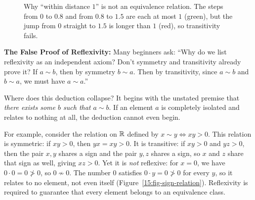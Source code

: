 \begin{figure}[htbp]
\centering
{}
\caption{Why ``within distance $1$'' is not an equivalence relation. The steps from $0$ to $0.8$ and from $0.8$ to $1.5$ are each at most $1$ (green), but the jump from $0$ straight to $1.5$ is longer than $1$ (red), so transitivity fails.}
\label{15:fig-closeness-trap}
\end{figure}

\begin{trapbox}
\textbf{The False Proof of Reflexivity:}
Many beginners ask: ``Why do we list reflexivity as an independent axiom? Don't symmetry and transitivity already prove it? If $a \sim b$, then by symmetry $b \sim a$. Then by transitivity, since $a \sim b$ and $b \sim a$, we must have $a \sim a$.''

Where does this deduction collapse? It begins with the unstated premise that \emph{there exists some $b$ such that $a \sim b$}. If an element $a$ is completely isolated and relates to nothing at all, the deduction cannot even begin.

For example, consider the relation on $\mathbb{R}$ defined by $x \sim y \iff xy > 0$. 
This relation is symmetric: if $xy > 0$, then $yx = xy > 0$.
It is transitive: if $xy > 0$ and $yz > 0$, then the pair $x, y$ shares a sign and the pair $y, z$ shares a sign, so $x$ and $z$ share that sign as well, giving $xz > 0$.
Yet it is \emph{not} reflexive: for $x = 0$, we have $0 \cdot 0 = 0 \not> 0$, so $0 \not\sim 0$. The number $0$ satisfies $0 \cdot y = 0 \not> 0$ for every $y$, so it relates to no element, not even itself (Figure~\ref{15:fig-sign-relation}). Reflexivity is required to guarantee that every element belongs to an equivalence class.
\end{trapbox}

